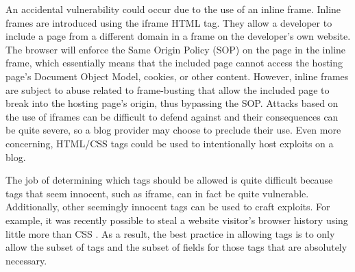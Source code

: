 An accidental vulnerability could occur due to the use of an inline
frame. Inline frames are introduced using the iframe HTML tag. They
allow a developer to include a page from a different domain in a frame
on the developer's own website. The browser will enforce the Same
Origin Policy (SOP) on the page in the inline frame, which essentially
means that the included page cannot access the hosting page's Document
Object Model, cookies, or other content. However, inline frames are
subject to abuse related to frame-busting \cite{framebusting1, framebusting2} that allow
the included page to break into the hosting page's origin, thus bypassing
the SOP. Attacks based on the use of iframes can be difficult to defend against
and their consequences can be quite severe, so a blog provider may
choose to preclude their use. Even more concerning, HTML/CSS
tags could be used to intentionally host exploits on a blog.

The job of determining which tags should be allowed is quite difficult
because tags that seem innocent, such as iframe, can in fact be quite
vulnerable. Additionally, other seemingly innocent tags can be used
to craft exploits. For example, it was recently possible to steal
a website visitor's browser history using little more than CSS \cite{historyhack}.
As a result, the best practice in allowing tags is to only allow the
subset of tags and the subset of fields for those tags that are absolutely
necessary. 
